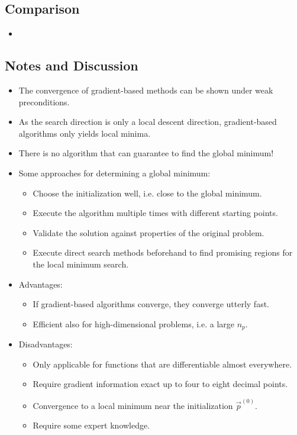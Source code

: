 		\subsection{Comparison} %

			\begin{itemize}
				\item
			\end{itemize}

		\subsection{Notes and Discussion}
			\begin{itemize}
				\item The convergence of gradient-based methods can be shown under weak preconditions.
				\item As the search direction is only a local descent direction, gradient-based algorithms only yields local minima.
				\item There is no algorithm that can guarantee to find the global minimum!
				\item Some approaches for determining a global minimum:
					\begin{itemize}
						\item Choose the initialization well, i.e. close to the global minimum.
						\item Execute the algorithm multiple times with different starting points.
						\item Validate the solution against properties of the original problem.
						\item Execute direct search methods beforehand to find promising regions for the local minimum search.
					\end{itemize}
			\end{itemize}

			\begin{itemize}
				\item Advantages:
					\begin{itemize}
						\item If gradient-based algorithms converge, they converge utterly fast.
						\item Efficient also for high-dimensional problems, i.e. a large \( n_p \).
					\end{itemize}
				\item Disadvantages:
					\begin{itemize}
						\item Only applicable for functions that are differentiable almost everywhere.
						\item Require gradient information exact up to four to eight decimal points.
						\item Convergence to a local minimum near the initialization \( \vec{p}^{(0)} \).
						\item Require some expert knowledge.
					\end{itemize}
			\end{itemize}

